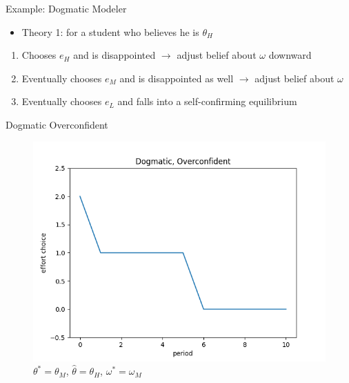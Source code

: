 \documentclass[aspectratio=169]{beamer}
\begin{document}
\begin{frame}{Example: Dogmatic Modeler}
\begin{itemize}
    \item Theory 1: for a student who believes he is $\theta_H$
    \end{itemize}
    \bigskip
    \begin{enumerate}
        \item Chooses $e_H$ and is disappointed $\rightarrow$ adjust belief about $\omega$ downward\\
        \bigskip
        \item Eventually chooses $e_M$ and is disappointed as well $\rightarrow$ adjust belief about $\omega$\\
        \bigskip
        \item Eventually chooses $e_L$ and falls into a self-confirming equilibrium
    \end{enumerate}
    
    
\end{frame}

\begin{frame}{Dogmatic Overconfident}
    \begin{figure}
        \centering
        \includegraphics[scale=.5]{figures2/dogmatic_over_11.png}
        \caption{$\theta^*=\theta_M$, $\hat\theta=\theta_H$, $\omega^*=\omega_M$}
    \end{figure}
\end{frame}
\end{document}
